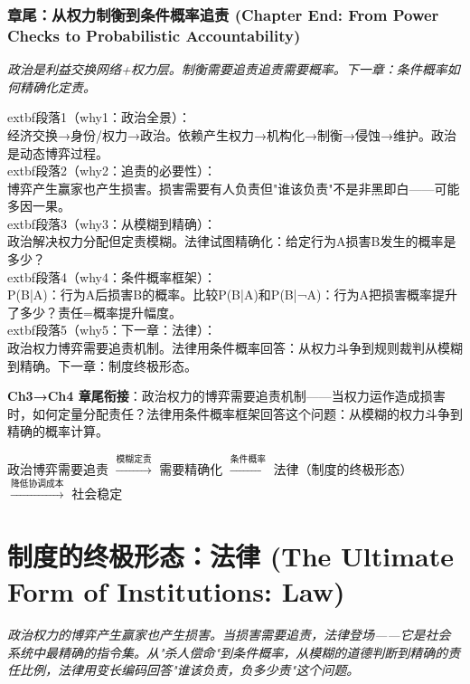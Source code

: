 \documentclass[a4paper,12pt]{book}
\newenvironment{motivation}{\begin{tcolorbox}[colback=gray!10,colframe=gray!60,title=\textit{动机}]\small\itshape}{\end{tcolorbox}}
\newenvironment{logicmap}{\begin{tcolorbox}[colback=blue!5,colframe=blue!50,title=\textbf{逻辑地图}]\centering}{\end{tcolorbox}}
\begin{document}
\begin{motivation}
\begin{motivation}
\begin{motivation}
	\subsection{章尾：从权力制衡到条件概率追责 (Chapter End: From Power Checks to Probabilistic Accountability)}
	\begin{motivation}政治是利益交换网络+权力层。制衡需要追责追责需要概率。下一章：条件概率如何精确化定责。\end{motivation}
		extbf{段落1（why1：政治全景）}：\\经济交换→身份/权力→政治。依赖产生权力→机构化→制衡→侵蚀→维护。政治是动态博弈过程。\\	extbf{段落2（why2：追责的必要性）}：\\博弈产生赢家也产生损害。损害需要有人负责但"谁该负责"不是非黑即白——可能多因一果。\\	extbf{段落3（why3：从模糊到精确）}：\\政治解决权力分配但定责模糊。法律试图精确化：给定行为A损害B发生的概率是多少？\\	extbf{段落4（why4：条件概率框架）}：\\P(B|A)：行为A后损害B的概率。比较P(B|A)和P(B|¬A)：行为A把损害概率提升了多少？责任=概率提升幅度。\\	extbf{段落5（why5：下一章：法律）}：\\政治权力博弈需要追责机制。法律用条件概率回答：从权力斗争到规则裁判从模糊到精确。下一章：制度终极形态。


	\textbf{Ch3→Ch4 章尾衔接}：政治权力的博弈需要追责机制——当权力运作造成损害时，如何定量分配责任？法律用条件概率框架回答这个问题：从模糊的权力斗争到精确的概率计算。




	\begin{logicmap}
		政治博弈需要追责 $\xrightarrow{\text{模糊定责}}$ 需要精确化 $\xrightarrow{\text{条件概率}}$ 法律（制度的终极形态）$\xrightarrow{\text{降低协调成本}}$ 社会稳定
	\end{logicmap}

	\chapter{制度的终极形态：法律 (The Ultimate Form of Institutions: Law)}
	\begin{motivation}
		政治权力的博弈产生赢家也产生损害。当损害需要追责，法律登场——它是社会系统中最精确的指令集。从"杀人偿命"到条件概率，从模糊的道德判断到精确的责任比例，法律用变长编码回答"谁该负责，负多少责"这个问题。
	\end{motivation}


\end{motivation}
\end{motivation}
\end{motivation}
\end{document}
